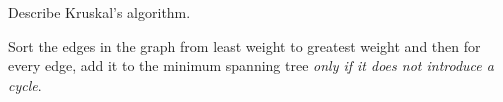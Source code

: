 \question Describe Kruskal's algorithm.

\begin{solution}[0.5in]
Sort the edges in the graph from least weight to greatest weight and then for
every edge, add it to the minimum spanning tree \emph{only if it does not
introduce a cycle}.
\end{solution}
